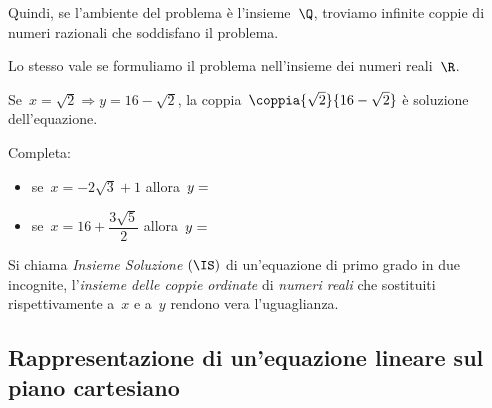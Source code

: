 \begin{soluzione}
Quindi, se l'ambiente del problema è
l'insieme~\(\Q\), troviamo infinite coppie di
numeri razionali che soddisfano il problema.

Lo stesso vale se formuliamo il problema nell'insieme dei
numeri reali~\(\R\).

Se~\(x=\sqrt{2}\Rightarrow y=16-\sqrt{2}\), la 
coppia~\(\coppia{\sqrt{2}}{16-\sqrt{2}}\) è soluzione
dell'equazione. 


Completa:

\begin{itemize} [nosep]
\item se~\(x=-2\sqrt{3}+1\) allora~\(y=\dotfill\)
\item se~\(x=16+\dfrac{3\sqrt{5}}{2}\) allora~\(y=\dotfill\)
\end{itemize}
\end{soluzione}

\begin{definizione}{}{}
Si chiama \emph{Insieme Soluzione} \((\IS)\) di un'equazione di primo
grado in due incognite, l'\emph{insieme delle coppie
ordinate} di \emph{numeri reali} che sostituiti rispettivamente a~\(x\) e
a~\(y\) rendono vera l'uguaglianza.
\end{definizione}


\subsection{Rappresentazione di un'equazione lineare sul piano cartesiano}

